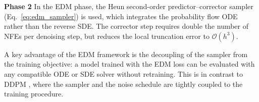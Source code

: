\textbf{Phase 2} \quad In the EDM phase, the Heun second-order
predictor--corrector sampler (Eq.\ \ref{eq:edm_sampler}) is used, which
integrates the probability flow ODE rather than the reverse SDE. The 
corrector step requires double the number of NFEs per 
denoising step, but reduces the local truncation error to 
\(\mathcal{O}(h^3)\).

A key advantage of the EDM framework is the decoupling of the sampler
from the training objective: a model trained with the EDM loss can be
evaluated with any compatible ODE or SDE solver without retraining. This
is in contrast to DDPM \cite{ho2020ddpm}, where the sampler and the
noise schedule are tightly coupled to the training procedure.

